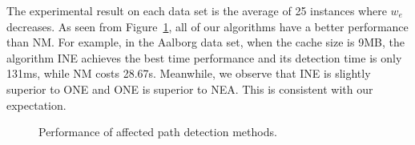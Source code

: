 The experimental result on each data set is the average of 25 instances where $w_e$ decreases.
As seen from Figure~\ref{fig:comparison-detecttime}, all of our algorithms have a better performance than NM.
For example, in the Aalborg data set, when the cache size is 9MB, the algorithm INE achieves the best time performance and its detection time is only 131ms, while NM costs 28.67s. Meanwhile, we observe that INE is slightly superior to ONE and ONE is superior to NEA. This is consistent with our expectation.
\begin{figure}[htbp]
\centering
 \caption{Performance of affected path detection methods.}
 \label{fig:comparison-detecttime}
\end{figure}


